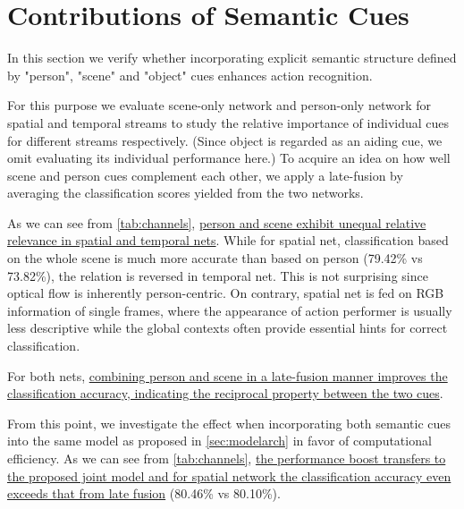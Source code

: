 \section{Contributions of Semantic Cues}\label{sec:cues}
In this section we verify whether incorporating explicit semantic structure defined by "person", "scene" and "object" cues enhances action recognition.

For this purpose we evaluate scene-only network and person-only network for spatial and temporal streams to study the relative importance of individual cues for different streams respectively.
(Since object is regarded as an aiding cue, we omit evaluating its individual performance here.)
To acquire an idea on how well scene and person cues complement each other, we apply a late-fusion by averaging the classification scores yielded from the two networks.

As we can see from \autoref{tab:channels}, \ul{person and scene exhibit unequal relative relevance in spatial and temporal nets}.
While for spatial net, classification based on the whole scene is much more accurate than based on person (79.42\% vs 73.82\%), the relation is reversed in temporal net.
This is not surprising since optical flow is inherently person-centric.
On contrary, spatial net is fed on RGB information of single frames, where the appearance of action performer is usually less descriptive while the global contexts often provide essential hints for correct classification.

For both nets, \ul{combining person and scene in a late-fusion manner improves the classification accuracy, indicating the reciprocal property between the two cues}.

From this point, we investigate the effect when incorporating both semantic cues into the same model as proposed in \autoref{sec:modelarch} in favor of computational efficiency.
As we can see from \autoref{tab:channels}, \ul{the performance boost transfers to the proposed joint model and for spatial network the classification accuracy even exceeds that from late fusion} (80.46\% vs 80.10\%).

